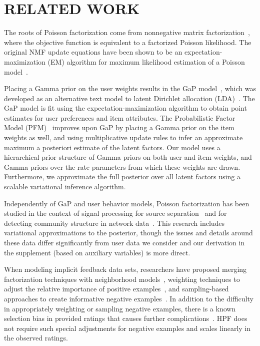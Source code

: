 \section{RELATED WORK}
\label{sec:related}
The roots of Poisson factorization come from nonnegative matrix
factorization~\cite{Lee:1999}, where the objective function is
equivalent to a factorized Poisson likelihood.  The original NMF
update equations have been shown to be an expectation-maximization
(EM) algorithm for maximum likelihood estimation of a Poisson
model~\cite{Cemgil:2009}.

Placing a Gamma prior on the user weights results in the GaP
model~\cite{Canny:2004}, which was developed as an alternative text
model to latent Dirichlet allocation
(LDA)~\cite{Blei:2003b,Inouye:2014}. The GaP model is fit using the
expectation-maximization algorithm to obtain point estimates for user
preferences and item attributes. The Probabilistic Factor Model
(PFM)~\cite{Ma:2011} improves upon GaP by placing a Gamma prior on the
item weights as well, and using multiplicative update rules to infer
an approximate maximum a posteriori estimate of the latent factors.
Our model uses a hierarchical prior
structure of Gamma priors on both user and item weights, and Gamma
priors over the rate parameters from which these weights are
drawn. Furthermore, we approximate the full posterior over all
latent factors using a scalable variational inference algorithm.

Independently of GaP and user behavior models, Poisson factorization
has been studied in the context of signal processing for source
separation~\cite{Cemgil:2009,Hoffman:2012} and for
detecting community structure in network
data~\cite{Ball:2011,Gopalan:2013}. This research includes variational
approximations to the posterior, though the issues and details around
these data differ significantly from user data we consider and our
derivation in the supplement (based on auxiliary variables) is more direct.

When modeling implicit feedback data sets, researchers have proposed
merging factorization techniques with neighborhood
models~\cite{Koren:2008}, weighting techniques to adjust the relative
importance of positive examples~\cite{Hu:2008p9402}, and
sampling-based approaches to create informative negative
examples~\cite{Gantner:2012p9364,Dror:2012a,Paquet:2013p9197}.  In
addition to the difficulty in appropriately weighting or sampling
negative examples, there is a known selection bias in provided ratings
that causes further complications~\cite{Marlin:2012}.  HPF
does not require such special adjustments for negative examples and
scales linearly in the observed ratings.


